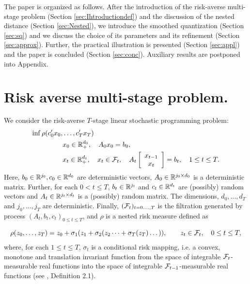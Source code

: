 \documentclass{article}              %
\begin{document}
The paper is organized as follows. After the introduction of the risk-averse
multi-stage problem (Section \ref{sec:Ihtroductiondef}) and the discussion
of the nested distance (Section \ref{sec:Nested}), we introduce the
smoothed quantization (Section \ref{sec:sq}) and we discuss the choice
of its parameters and its refinement (Section \ref{sec:approx}).
Further, the practical illustration is presented (Section \ref{sec:appl})
and the paper is concluded (Section \ref{sec:conc}). Auxiliary results
are postponed into Appendix.

\section{\label{sec:Ihtroductiondef} Risk averse multi-stage problem.}

We consider the risk-averse $T$-stage linear stochastic programming
problem:
\begin{equation}\label{eq:p}
\begin{split}
\inf\rho(c'_{0}x_{0},&\dots,c'_{T}x_{T})\\
&x_{0}\in\mathbb{R}_{+}^{d_{0}},\quad A_{0}x_{0}=b_{0},\\
&x_{t}\in\mathbb{R}_{+}^{d_{t}},\quad x_{t}\in\mathcal{F}_{t},\quad A_{t}
\left[\begin{array}{c}
x_{t-1}\\
x_{t}
\end{array}\right]=b_{t},\quad1\leq t\leq T.
\end{split}
\end{equation}
Here, $b_{0}\in\mathbb{R}^{j_{0}},c_{0}\in\mathbb{R}^{d_{0}}$ are deterministic vectors,
$A_{0}\in\mathbb{R}^{j_{0}\times d_{0}}$ is a deterministic matrix. Further,
for each $0<t\leq T$, $b_{t}\in\mathbb{R}^{j_{t}}$ and $c_{t}\in\mathbb{R}^{d_{t}}$ are
(possibly) random vectors and $A_{t}\in\mathbb{R}^{j_{t}\times d_{t}}$ is
a (possibly) random matrix. The dimensions, $d_{0},\dots,d_{T}$ and
$j_{0},\dots,j_{T}$ are deterministic. Finally, $(\mathcal{F}_{t})_{t=0.\dots,T}$
is the filtration generated by process $(A_{t},b_{t},c_{t})_{0\leq t\leq T}$,
and $\rho$ is a nested risk measure defined as

\[
\rho(z_{0},\dots,z_{T})=z_{0}+\sigma_{1}(z_{1}+\sigma_{2}(z_{2}\dots+\sigma_{T}(z_{T})\dots)),\qquad z_{t}\in\mathcal{F}_{t},\quad0\leq t\leq T,
\]
where, for each $1\leq t\leq T$, $\sigma_{t}$ is a conditional risk
mapping, i.e. a convex, monotone and translation invariant function
from the space of integrable $\mathcal{F}_{t}$-measurable real functions into
the space of integrable $\mathcal{F}_{t-1}$-measurable real functions (see
\cite{ruszczynski2006conditional}, Definition 2.1). 
\end{document}
